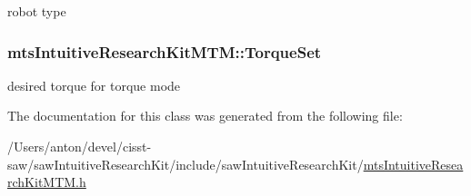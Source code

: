 robot type 

\hypertarget{classmts_intuitive_research_kit_m_t_m_a78cce153418a304d9be36458e2252c4f}{}
\subsubsection[{Torque\+Set}]{ mts\+Intuitive\+Research\+Kit\+M\+T\+M\+::\+Torque\+Set\hspace{0.3cm}{\ttfamily [protected]}}\label{classmts_intuitive_research_kit_m_t_m_a78cce153418a304d9be36458e2252c4f}


desired torque for torque mode 



The documentation for this class was generated from the following file\+:\begin{DoxyCompactItemize}
\item 
/\+Users/anton/devel/cisst-\/saw/saw\+Intuitive\+Research\+Kit/include/saw\+Intuitive\+Research\+Kit/\hyperlink{mts_intuitive_research_kit_m_t_m_8h}{mts\+Intuitive\+Research\+Kit\+M\+T\+M.\+h}\end{DoxyCompactItemize}
